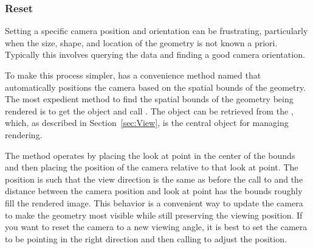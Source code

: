 



\subsubsection{Reset}


Setting a specific camera position and orientation can be frustrating,
particularly when the size, shape, and location of the geometry is not
known a priori. Typically this involves querying the data and finding a
good camera orientation.

To make this process simpler,  has a convenience
method named  that automatically positions the
camera based on the spatial bounds of the geometry. The most expedient
method to find the spatial bounds of the geometry being rendered is to get
the  object and call . The
 object can be retrieved from the
, which, as described in Section~\ref{sec:View}, is the
central object for managing rendering.


The  method operates by placing the look at point
in the center of the bounds and then placing the position of the camera
relative to that look at point. The position is such that the view
direction is the same as before the call to  and
the distance between the camera position and look at point has the bounds
roughly fill the rendered image. This behavior is a convenient way to
update the camera to make the geometry most visible while still preserving
the viewing position. If you want to reset the camera to a new viewing
angle, it is best to set the camera to be pointing in the right direction
and then calling  to adjust the position.




